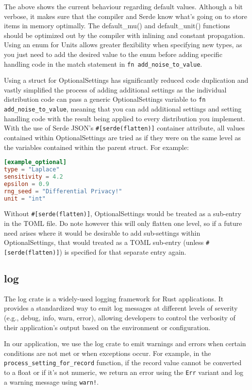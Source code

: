 The above shows the current behaviour regarding default values. Although a bit verbose, it makes sure that the compiler and Serde know what's going on to store items in memory optimally. The default\_mu() and default\_unit() functions should be optimized out by the compiler with inlining and constant propagation. Using an enum for Units allows greater flexibility when specifying new types, as you just need to add the desired value to the enum before adding specific handling code in the match statement in \texttt{fn add\_noise\_to\_value}.

Using a struct for OptionalSettings has significantly reduced code duplication and vastly simplified the process of adding additional settings as the individual distribution code can pass a generic OptionalSettings variable to \texttt{fn add\_noise\_to\_value}, meaning that you can add additional settings and setting handling code with the result being applied to every distribution you implement. With the use of Serde JSON's \texttt{\#[serde(flatten)]} container attribute, all values contained within OptionalSettings are tried as if they were on the same level as the variables contained within the parent struct. For example:

\begin{lstlisting}[language=TOML, caption={Example privacy setting with fixed RNG seed}]
[example_optional]
type = "Laplace"
sensitivity = 4.2
epsilon = 0.9
rng_seed = "Differential Privacy!"
unit = "int"
\end{lstlisting}
Without \texttt{\#[serde(flatten)]}, OptionalSettings would be treated as a sub-entry in the TOML file. Do note however this will only flatten one level, so if a future need arises where it would be desirable to add sub-settings within OptionalSettings, that would treated as a TOML sub-entry (unless \texttt{\#[serde(flatten)]}) is specified for that separate entry again.

\subsection{log}
The log crate is a widely-used logging framework for Rust applications. It provides a standardized way to emit log messages at different levels of severity (e.g., debug, info, warn, error), allowing developers to control the verbosity of their application's output based on the environment or configuration.

In our application, we use the log crate to emit warnings and errors when certain conditions are not met or when exceptions occur. For example, in the \texttt{process\_setting\_for\_record} function, if the record value cannot be converted to a float or if it's not numeric, we return an error using the \texttt{Err} variant and log a warning message using \texttt{warn!}.


